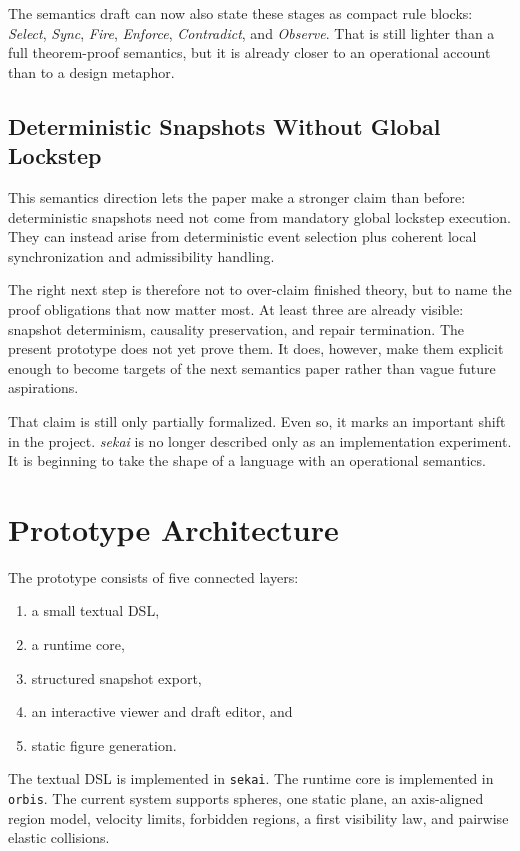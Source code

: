 \documentclass[sigplan,review,anonymous]{acmart}
\begin{document}
The semantics draft can now also state these stages as compact rule blocks:
\emph{Select}, \emph{Sync}, \emph{Fire}, \emph{Enforce}, \emph{Contradict}, and \emph{Observe}.
That is still lighter than a full theorem-proof semantics, but it is already closer to an operational account than to a design metaphor.

\subsection{Deterministic Snapshots Without Global Lockstep}

This semantics direction lets the paper make a stronger claim than before:
deterministic snapshots need not come from mandatory global lockstep execution.
They can instead arise from deterministic event selection plus coherent local synchronization and admissibility handling.

The right next step is therefore not to over-claim finished theory, but to name the proof obligations that now matter most.
At least three are already visible:
snapshot determinism, causality preservation, and repair termination.
The present prototype does not yet prove them.
It does, however, make them explicit enough to become targets of the next semantics paper rather than vague future aspirations.

That claim is still only partially formalized.
Even so, it marks an important shift in the project.
\emph{sekai} is no longer described only as an implementation experiment.
It is beginning to take the shape of a language with an operational semantics.

\section{Prototype Architecture}

The prototype consists of five connected layers:
\begin{enumerate}
\item a small textual DSL,
\item a runtime core,
\item structured snapshot export,
\item an interactive viewer and draft editor, and
\item static figure generation.
\end{enumerate}

The textual DSL is implemented in \texttt{sekai}.
The runtime core is implemented in \texttt{orbis}.
The current system supports spheres, one static plane, an axis-aligned region model, velocity limits, forbidden regions, a first visibility law, and pairwise elastic collisions.
\end{document}
